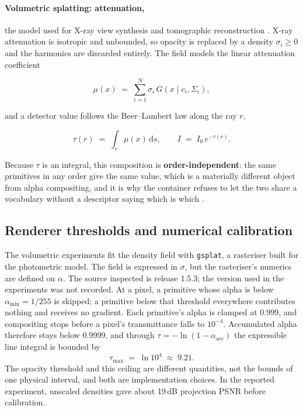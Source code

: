 \documentclass[11pt,a4paper]{article}
\newcommand{\code}[1]{\texttt{\small #1}}
\begin{document}
\paragraph{Volumetric splatting: attenuation,} the model used for X-ray view synthesis
and tomographic reconstruction \cite{xgaussian,r2gaussian}. X-ray attenuation
is isotropic and unbounded, so opacity is replaced by a density $\sigma_i \ge 0$ and the
harmonics are discarded entirely. The field models the linear attenuation coefficient

\[
  \mu(x) \;=\; \sum_{i=1}^{N} \sigma_i \, G(x \mid c_i, \Sigma_i),
\]

and a detector value follows the Beer--Lambert law along the ray $r$,

\[
  \tau(r) \;=\; \int_r \mu(x)\, \mathrm{d}s,
  \qquad
  I \;=\; I_0 \, e^{-\tau(r)} .
\]

Because $\tau$ is an integral, this composition is \textbf{order-independent}: the same
primitives in any order give the same value, which is a materially different object from
alpha compositing, and it is why the container refuses to let the two share a vocabulary
without a descriptor saying which is which \cite{uosspec}.

\subsection{Renderer thresholds and numerical calibration}\label{app:ceiling}

The volumetric experiments fit the density field with \code{gsplat}, a rasteriser built
for the photometric model. The field is expressed in $\sigma$, but the rasteriser's
numerics are defined on $\alpha$. The source inspected is release 1.5.3; the version used in
the experiments was not recorded. At a pixel, a primitive whose alpha is below
$\alpha_{\min} = 1/255$ is skipped; a primitive below that threshold everywhere contributes
nothing and receives no gradient. Each primitive's alpha is clamped at 0.999, and
compositing stops before a pixel's transmittance falls to $10^{-4}$. Accumulated alpha
therefore stays below 0.9999, and through $\tau = -\ln(1 - \alpha_{\mathrm{acc}})$ the
expressible line integral is bounded by
\[
  \tau_{\max} \;=\; \ln 10^{4} \;\approx\; 9.21 .
\]
The opacity threshold and this ceiling are different quantities, not the bounds of one
physical interval, and both are implementation choices. In the reported experiment,
unscaled densities gave about 19\,dB projection PSNR before calibration.
\end{document}

